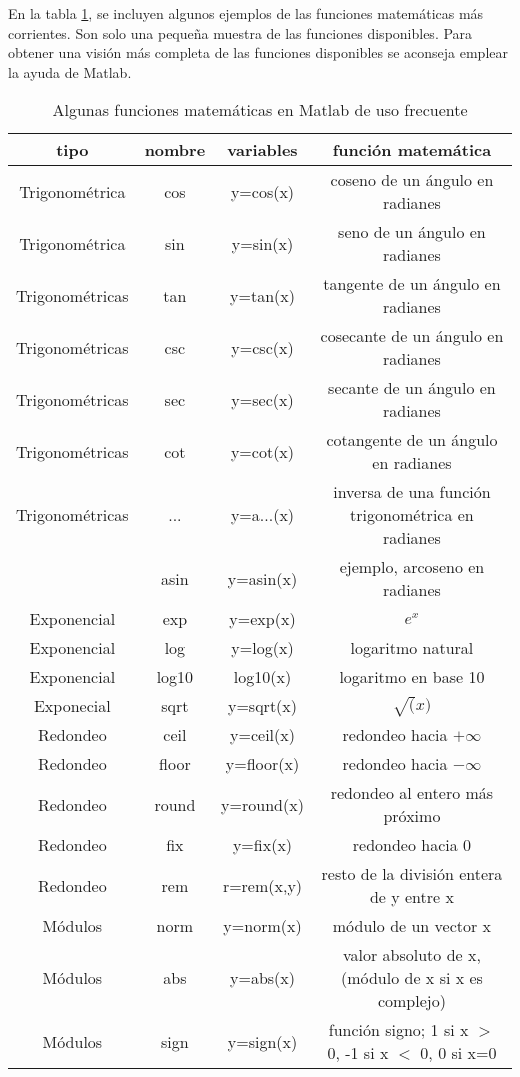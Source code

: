 En la tabla \ref{tabfun}, se incluyen algunos ejemplos de las funciones matemáticas más corrientes. Son solo una pequeña muestra de las funciones disponibles. Para obtener una visión más completa de las funciones disponibles se aconseja emplear la ayuda de Matlab.

\begin{table}
\caption{Algunas funciones matemáticas en Matlab de uso frecuente}
\label{tabfun}
\begin{tabular}{c|c|c|c}
tipo&nombre&variables&función matemática\\
\hline
\hline
Trigonométrica&cos&y=cos(x)&coseno de un ángulo en radianes\\
\hline
Trigonométrica&sin&y=sin(x)&seno de un ángulo en radianes\\
\hline
Trigonométricas&tan&y=tan(x)&tangente de un ángulo en radianes\\
\hline
Trigonométricas&csc&y=csc(x)&cosecante de un ángulo en radianes\\
\hline
Trigonométricas&sec&y=sec(x)&secante de un ángulo en radianes\\
\hline
Trigonométricas&cot&y=cot(x)&cotangente de un ángulo en radianes\\

\hline
Trigonométricas&...&y=a...(x)&inversa de una función trigonométrica en radianes\\
&asin&y=asin(x)&ejemplo, arcoseno en radianes\\
\hline
\hline
Exponencial&exp&y=exp(x)&$e^x$\\
\hline
Exponencial&log&y=log(x)&logaritmo natural\\
\hline
Exponencial&log10&log10(x)&logaritmo en base 10\\
\hline
Exponecial&sqrt&y=sqrt(x)&$\sqrt(x)$\\
\hline
\hline
Redondeo&ceil&y=ceil(x)& redondeo hacia $+\infty$\\
\hline
Redondeo&floor&y=floor(x)&redondeo hacia $-\infty$\\
\hline
Redondeo&round&y=round(x)&redondeo al entero más próximo\\
\hline
Redondeo&fix&y=fix(x)&redondeo hacia $0$\\
\hline
Redondeo&rem&r=rem(x,y)&resto de la división entera de y entre x\\
\hline
\hline
Módulos&norm&y=norm(x)& módulo de un vector x\\
\hline
Módulos&abs&y=abs(x)&valor absoluto de x,(módulo de x si x es complejo)\\
\hline
Módulos&sign&y=sign(x)&función signo; 1 si x $>$ 0, -1 si x $<$ 0, 0 si x=0\\
\end{tabular}
\end{table}


